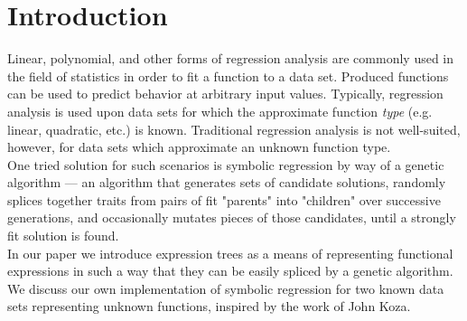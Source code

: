 
\section{Introduction}
\label{sec:intro}

Linear, polynomial, and other forms of regression analysis are commonly
used in the field of statistics in order to fit a function to a data set. Produced
functions can be used to predict behavior at arbitrary input values. Typically,
regression analysis is used upon data sets for which the approximate
function \textit{type} (e.g. linear, quadratic, etc.) is known. Traditional
regression analysis is not well-suited, however, for data sets which
approximate an unknown function type. \\

One tried solution for such scenarios is symbolic regression by way of
a genetic algorithm --- an algorithm that generates sets of candidate
solutions, randomly splices together traits from pairs of fit "parents"
into "children" over successive generations, and occasionally mutates
pieces of those candidates, until a strongly fit solution is found. \\

In our paper we introduce expression trees as a means of representing
functional expressions in such a way that they can be easily spliced by
a genetic algorithm. We discuss our own implementation of symbolic
regression for two known data sets representing unknown functions,
inspired by the work of John Koza. \cite{examplerun}

